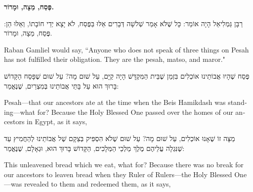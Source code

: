  
\vspace{3em}
 
\begin{center}
{\large \bfseries \textcolor{light-gray}{
פֶּסַח, מַצָה, וּמָרוֹר.
}}
\end{center}
 
 רַבָּן גַּמְלִיאֵל הָיָה אוֹמֵר: כָּל שֶׁלֹּא אָמַר שְׁלשָׁה דְּבָרִים אֵלּוּ בַּפֶּסַח, לֹא יָצָא יְדֵי חוֹבָתוֹ, וְאֵלּוּ הֵן: פֶּסַח, מַצָה, וּמָרוֹר.
 
 \begin{english}
Raban Gamliel would say, ``Anyone who does not speak of three things on Pesah has not fulfilled their obligation. They are the pesah, matso, and maror."
 \end{english}
 

פֶּסַח שֶׁהָיוּ אֲבוֹתֵינוּ אוֹכְלִים בִּזְמַן שֶׁבֵּית הַמִּקְדָּשׁ הָיָה קַיָּם, עַל שׁוּם מָה? עַל שׁוּם שֶׁפָּסַח הַקָּדוֹשׁ בָּרוּךְ הוּא עַל בָּתֵּי אֲבוֹתֵינוּ בְּמִצְרַיִם, שֶׁנֶּאֱמַר:

\begin{english}
Pesah—that our ancestors ate at the time when the Beis Hamikdash was standing—what for? Because the Holy Blessed One passed over the homes of our ancestors in Egypt, as it says, 
\end{english}


מַצָּה זוֹ שֶׁאָנוּ אוֹכְלִים, עַל שׁוּם מָה? עַל שׁוּם שֶׁלֹא הִסְפִּיק בְּצֵקָם שֶׁל אֲבוֹתֵינוּ לְהַחֲמִיץ עַד שֶׁנִּגְלָה עֲלֵיהֶם מֶלֶךְ מַלְכֵי הַמְּלָכִים, הַקָּדוֹשׁ בָּרוּךְ הוּא, וּגְאָלָם, שֶׁנֶּאֱמַר:

\begin{english}
This unleavened bread which we eat, what for? Because there was no break for our ancestors to leaven bread when they Ruler of Rulers—the Holy Blessed One—was revealed to them and redeemed them, as it says, 
\end{english}

